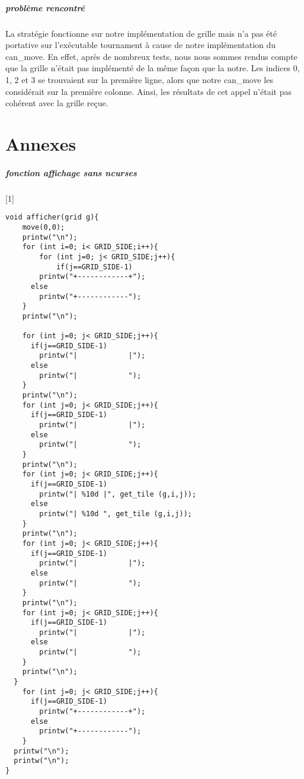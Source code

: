 \documentclass{report}
\begin{document}
\paragraph{problème rencontré} La stratégie fonctionne sur notre implémentation de grille mais n'a pas été portative sur l'exécutable tournament à cause de notre implémentation du can{\_}move. En effet, après de nombreux tests, nous nous sommes rendus compte que la grille n'était pas implémenté de la même façon que la notre. Les indices 0, 1, 2 et 3 se trouvaient sur la première ligne, alors que notre can{\_}move les considérait sur la première colonne. Ainsi, les résultats de cet appel n'était pas cohérent avec la grille reçue.

\chapter*{Annexes}

\paragraph{fonction affichage sans ncurses}[1]
\begin{lstlisting}
void afficher(grid g){
	move(0,0);
	printw("\n");
	for (int i=0; i< GRID_SIDE;i++){
		for (int j=0; j< GRID_SIDE;j++){
			if(j==GRID_SIDE-1)
        printw("+------------+");
      else
        printw("+------------");
    }
    printw("\n");

    for (int j=0; j< GRID_SIDE;j++){
      if(j==GRID_SIDE-1)
        printw("|            |");
      else
        printw("|            ");
    }
    printw("\n");
    for (int j=0; j< GRID_SIDE;j++){
      if(j==GRID_SIDE-1)
        printw("|            |");
      else
        printw("|            ");
    }
    printw("\n");
    for (int j=0; j< GRID_SIDE;j++){
      if(j==GRID_SIDE-1)
        printw("| %10d |", get_tile (g,i,j));
      else
        printw("| %10d ", get_tile (g,i,j));
    }
    printw("\n");
    for (int j=0; j< GRID_SIDE;j++){
      if(j==GRID_SIDE-1)
        printw("|            |");
      else
        printw("|            ");
    }
    printw("\n");
    for (int j=0; j< GRID_SIDE;j++){
      if(j==GRID_SIDE-1)
        printw("|            |");
      else
        printw("|            ");
    }
    printw("\n");
  }
    for (int j=0; j< GRID_SIDE;j++){
      if(j==GRID_SIDE-1)
        printw("+------------+");
      else
        printw("+------------");
    }
  printw("\n");
  printw("\n");
}
\end{lstlisting}
\end{document}
